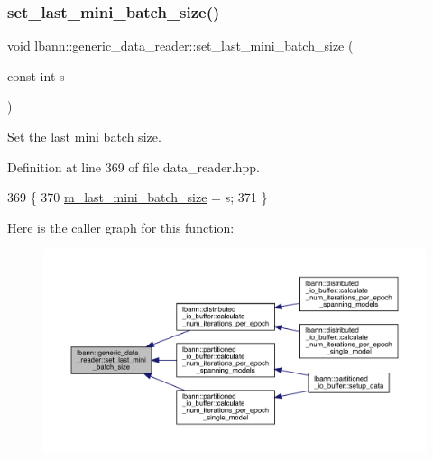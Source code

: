 \subsubsection{\texorpdfstring{set\+\_\+last\+\_\+mini\+\_\+batch\+\_\+size()}{set\_last\_mini\_batch\_size()}}
{\footnotesize\ttfamily void lbann\+::generic\+\_\+data\+\_\+reader\+::set\+\_\+last\+\_\+mini\+\_\+batch\+\_\+size (\begin{DoxyParamCaption}\item[{const int}]{s }\end{DoxyParamCaption})\hspace{0.3cm}{\ttfamily [inline]}}



Set the last mini batch size. 



Definition at line 369 of file data\+\_\+reader.\+hpp.


\begin{DoxyCode}
369                                              \{
370     \hyperlink{classlbann_1_1generic__data__reader_a241f77b6209de4ae656bc34ad51bb612}{m\_last\_mini\_batch\_size} = s;
371   \}
\end{DoxyCode}
Here is the caller graph for this function\+:\nopagebreak
\begin{figure}[H]
\begin{center}
\leavevmode
\includegraphics[width=350pt]{classlbann_1_1generic__data__reader_a357389ee93428b68f9400de708f6915d_icgraph}
\end{center}
\end{figure}
\mbox{\label{classlbann_1_1generic__data__reader_a343f7d791a04aa1ef30ff829a899e2ae}} 
